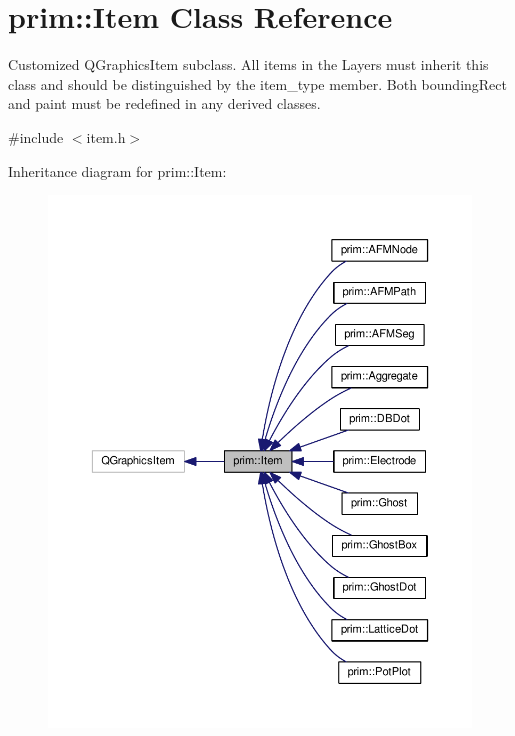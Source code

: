 \hypertarget{classprim_1_1Item}{}\section{prim\+:\+:Item Class Reference}
\label{classprim_1_1Item}


Customized Q\+Graphics\+Item subclass. All items in the Layers must inherit this class and should be distinguished by the item\+\_\+type member. Both bounding\+Rect and paint must be redefined in any derived classes.  




{\ttfamily \#include $<$item.\+h$>$}



Inheritance diagram for prim\+:\+:Item\+:\nopagebreak
\begin{figure}[H]
\begin{center}
\leavevmode
\includegraphics[width=350pt]{classprim_1_1Item__inherit__graph}
\end{center}
\end{figure}


